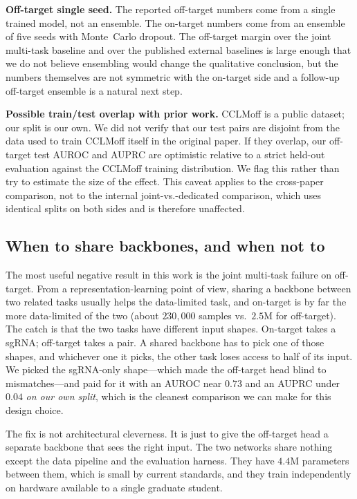 \documentclass[11pt,a4paper]{article}
\begin{document}
\textbf{Off-target single seed.} The reported off-target numbers come from a single trained model, not an ensemble. The on-target numbers come from an ensemble of five seeds with Monte~Carlo dropout. The off-target margin over the joint multi-task baseline and over the published external baselines is large enough that we do not believe ensembling would change the qualitative conclusion, but the numbers themselves are not symmetric with the on-target side and a follow-up off-target ensemble is a natural next step.

\textbf{Possible train/test overlap with prior work.} CCLMoff is a public dataset; our split is our own. We did not verify that our test pairs are disjoint from the data used to train CCLMoff itself in the original paper. If they overlap, our off-target test AUROC and AUPRC are optimistic relative to a strict held-out evaluation against the CCLMoff training distribution. We flag this rather than try to estimate the size of the effect. This caveat applies to the cross-paper comparison, not to the internal joint-vs.-dedicated comparison, which uses identical splits on both sides and is therefore unaffected.

\subsection{When to share backbones, and when not to}

The most useful negative result in this work is the joint multi-task failure on off-target. From a representation-learning point of view, sharing a backbone between two related tasks usually helps the data-limited task, and on-target is by far the more data-limited of the two (about $230{,}000$ samples vs.\ $2.5$M for off-target). The catch is that the two tasks have different input shapes. On-target takes a sgRNA; off-target takes a pair. A shared backbone has to pick one of those shapes, and whichever one it picks, the other task loses access to half of its input. We picked the sgRNA-only shape---which made the off-target head blind to mismatches---and paid for it with an AUROC near $0.73$ and an AUPRC under $0.04$ \emph{on our own split}, which is the cleanest comparison we can make for this design choice.

The fix is not architectural cleverness. It is just to give the off-target head a separate backbone that sees the right input. The two networks share nothing except the data pipeline and the evaluation harness. They have $4.4$M parameters between them, which is small by current standards, and they train independently on hardware available to a single graduate student.
\end{document}

